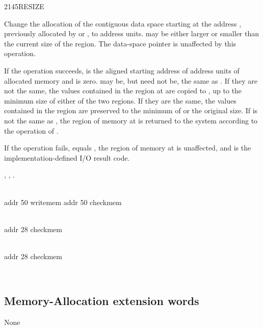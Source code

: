 \begin{worddef}{2145}{RESIZE}
\item {}

	Change the allocation of the contiguous data space starting at
	the address , previously allocated by
	 or , to  address units.
	 may 	be either larger or smaller than the current
	size of the region. The data-space pointer is unaffected by
	this operation.

	If the operation succeeds,  is the aligned
	starting address of  address units of allocated memory
	and  is zero.  may be, but need
	not be, the same as . If they are not the same,
	the values contained in the region at  are copied
	to , up to the minimum size of either of the
	two regions. If they are the same, the values contained in the
	region are preserved to the minimum of  or the original
	size.  If  is not the same as ,
	the region of memory at  is returned to the system
	according to the operation of .

	If the operation fails,  equals ,
	the region of memory at  is unaffected, and
	 is the implementation-defined I/O result code.

\see {},
	,
	.

	\begin{testing}\ttfamily
	\cbstart{}
		 \\
		addr  50 writemem addr  50 checkmem

		 \\
		addr  28 checkmem

		 \\
		addr  28 checkmem

		 \\
	\cbend
	\end{testing}
\end{worddef}


\subsection{Memory-Allocation extension words} %

None
